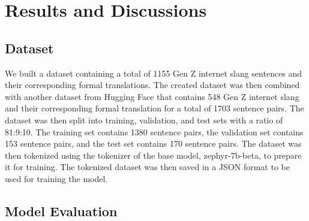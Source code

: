 \chapter{Results and Discussions}
\section{Dataset}
We built a dataset containing a total of 1155 Gen Z internet slang sentences and their corresponding formal translations. The created dataset was then combined with another dataset from Hugging Face that contains 548 Gen Z internet slang and their corresponding formal translation for a total of 1703 sentence pairs. The dataset was then split into training, validation, and test sets with a ratio of 81:9:10. The training set contains 1380 sentence pairs, the validation set contains 153 sentence pairs, and the test set contains 170 sentence pairs. The dataset was then tokenized using the tokenizer of the base model, zephyr-7b-beta, to prepare it for training. The tokenized dataset was then saved in a JSON format to be used for training the model.

\section{Model Evaluation}
